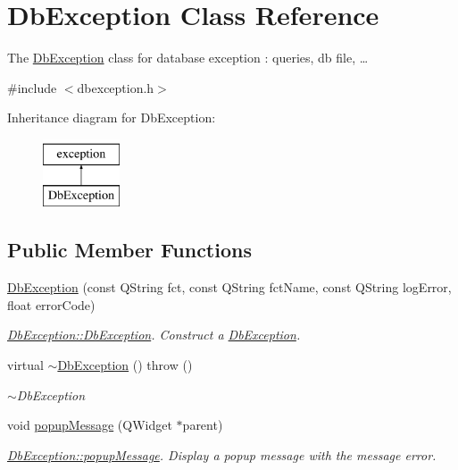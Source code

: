 \hypertarget{classDbException}{\section{Db\-Exception Class Reference}
\label{classDbException}
}


The \hyperlink{classDbException}{Db\-Exception} class for database exception \-: queries, db file, …  




{\ttfamily \#include $<$dbexception.\-h$>$}

Inheritance diagram for Db\-Exception\-:\begin{figure}[H]
\begin{center}
\leavevmode
\includegraphics[height=2.000000cm]{dd/dca/classDbException}
\end{center}
\end{figure}
\subsection*{Public Member Functions}
\begin{DoxyCompactItemize}
\item 
\hyperlink{classDbException_a22204317679895d999e3621cf97d5dee}{Db\-Exception} (const Q\-String fct, const Q\-String fct\-Name, const Q\-String log\-Error, float error\-Code)
\begin{DoxyCompactList}\small\item\em \hyperlink{classDbException_a22204317679895d999e3621cf97d5dee}{Db\-Exception\-::\-Db\-Exception}. Construct a \hyperlink{classDbException}{Db\-Exception}. \end{DoxyCompactList}\item 
\hypertarget{classDbException_a57b57d4d9010c06d158ccc44d45a1376}{virtual \hyperlink{classDbException_a57b57d4d9010c06d158ccc44d45a1376}{$\sim$\-Db\-Exception} ()  throw ()}\label{classDbException_a57b57d4d9010c06d158ccc44d45a1376}

\begin{DoxyCompactList}\small\item\em $\sim$\-Db\-Exception \end{DoxyCompactList}\item 
void \hyperlink{classDbException_a06765391cd11f596721c877c1a62c2f1}{popup\-Message} (Q\-Widget $\ast$parent)
\begin{DoxyCompactList}\small\item\em \hyperlink{classDbException_a06765391cd11f596721c877c1a62c2f1}{Db\-Exception\-::popup\-Message}. Display a popup message with the message error. \end{DoxyCompactList}\end{DoxyCompactItemize}


